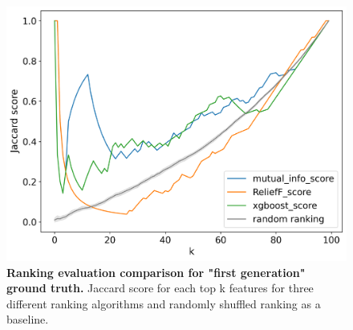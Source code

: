 \documentclass[fleqn,moreauthors,10pt]{ds_report}
\begin{document}
\begin{figure}
	\includegraphics[width=\linewidth]{img/report_top_k_scores_first_gen.png}
	\caption{\textbf{Ranking evaluation comparison for "first generation" ground truth.} Jaccard score for each top k features for three different ranking algorithms and randomly shuffled ranking as a baseline.}
	\label{fig:evaluation_comparison}
\end{figure}




% 


\end{document}
